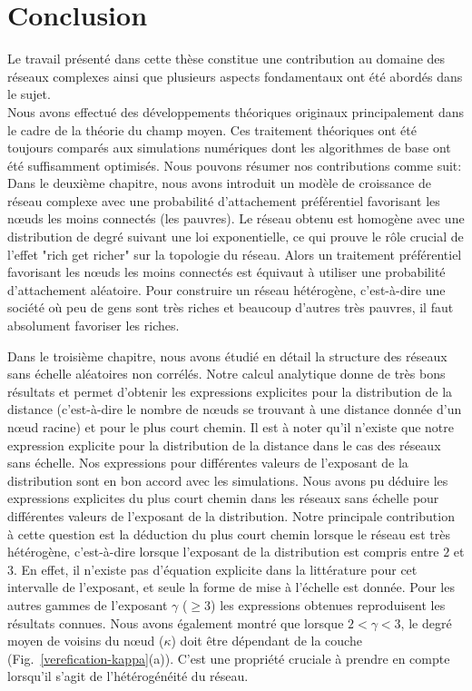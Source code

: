 
\chapter*{Conclusion}
 


Le travail présenté dans cette thèse constitue une contribution au domaine des réseaux complexes ainsi que plusieurs aspects fondamentaux ont été abordés dans le sujet.\\
Nous avons effectué des développements théoriques originaux principalement dans le cadre de la théorie du champ moyen. Ces traitement théoriques ont été toujours comparés aux simulations numériques dont les algorithmes de base ont été suffisamment optimisés. Nous pouvons résumer nos contributions comme suit: \\
Dans le deuxième chapitre, nous avons introduit un modèle de croissance de réseau complexe avec une probabilité d'attachement préférentiel favorisant les nœuds les moins connectés (les pauvres). Le réseau obtenu est homogène avec une distribution de degré suivant une loi exponentielle, ce qui prouve le rôle crucial de l'effet "rich get richer" sur la topologie du réseau. Alors un traitement préférentiel favorisant les nœuds les moins connectés est équivaut à utiliser une probabilité d'attachement aléatoire. Pour construire un réseau hétérogène, c'est-à-dire une société où peu de gens sont très riches et beaucoup d'autres très pauvres, il faut absolument favoriser les riches.



Dans le troisième chapitre, nous avons étudié en détail la structure  des réseaux sans échelle aléatoires non corrélés. Notre calcul analytique donne de très bons résultats et permet d'obtenir les expressions explicites pour la distribution de la distance (c'est-à-dire le nombre de nœuds se trouvant à une distance donnée d'un nœud racine) et pour le plus court chemin. Il est à noter qu'il n’existe que notre expression explicite pour la distribution de la distance dans le cas des réseaux sans échelle. Nos expressions pour différentes valeurs de l'exposant de la distribution sont en bon accord avec les simulations. Nous avons pu déduire les expressions explicites du plus court chemin dans les réseaux sans échelle pour différentes valeurs de l'exposant de la distribution. Notre principale contribution à cette question est la déduction du plus court chemin lorsque le réseau est très hétérogène, c'est-à-dire  lorsque l'exposant de la distribution est compris entre $2$ et $3$. En effet, il n’existe pas d’équation explicite dans la littérature pour cet intervalle de l'exposant, et seule la forme de mise à l'échelle est donnée. Pour les autres gammes de l'exposant $\gamma$ ($\geq 3$) les expressions obtenues reproduisent les résultats connues. 
Nous avons également montré que lorsque $2 <\gamma <3$, le degré moyen de voisins du nœud ($\kappa$) doit être dépendant de la couche (Fig.~\ref{verefication-kappa}(a)). C’est une propriété cruciale à prendre en compte lorsqu’il s’agit de l’hétérogénéité du réseau.



